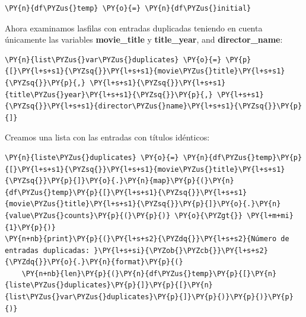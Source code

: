     \begin{tcolorbox}[breakable, size=fbox, boxrule=1pt, pad at break*=1mm,colback=cellbackground, colframe=cellborder]
\begin{Verbatim}[commandchars=\\\{\}]
\PY{n}{df\PYZus{}temp} \PY{o}{=} \PY{n}{df\PYZus{}initial}
\end{Verbatim}
\end{tcolorbox}

    Ahora examinamos lasfilas con entradas duplicadas teniendo en cuenta
únicamente las variables \textbf{movie\_title} y \textbf{title\_year},
and \textbf{director\_name}:

    \begin{tcolorbox}[breakable, size=fbox, boxrule=1pt, pad at break*=1mm,colback=cellbackground, colframe=cellborder]
\begin{Verbatim}[commandchars=\\\{\}]
\PY{n}{list\PYZus{}var\PYZus{}duplicates} \PY{o}{=} \PY{p}{[}\PY{l+s+s1}{\PYZsq{}}\PY{l+s+s1}{movie\PYZus{}title}\PY{l+s+s1}{\PYZsq{}}\PY{p}{,} \PY{l+s+s1}{\PYZsq{}}\PY{l+s+s1}{title\PYZus{}year}\PY{l+s+s1}{\PYZsq{}}\PY{p}{,} \PY{l+s+s1}{\PYZsq{}}\PY{l+s+s1}{director\PYZus{}name}\PY{l+s+s1}{\PYZsq{}}\PY{p}{]}
\end{Verbatim}
\end{tcolorbox}

    Creamos una lista con las entradas con títulos idénticos:

    \begin{tcolorbox}[breakable, size=fbox, boxrule=1pt, pad at break*=1mm,colback=cellbackground, colframe=cellborder]
\begin{Verbatim}[commandchars=\\\{\}]
\PY{n}{liste\PYZus{}duplicates} \PY{o}{=} \PY{n}{df\PYZus{}temp}\PY{p}{[}\PY{l+s+s1}{\PYZsq{}}\PY{l+s+s1}{movie\PYZus{}title}\PY{l+s+s1}{\PYZsq{}}\PY{p}{]}\PY{o}{.}\PY{n}{map}\PY{p}{(}\PY{n}{df\PYZus{}temp}\PY{p}{[}\PY{l+s+s1}{\PYZsq{}}\PY{l+s+s1}{movie\PYZus{}title}\PY{l+s+s1}{\PYZsq{}}\PY{p}{]}\PY{o}{.}\PY{n}{value\PYZus{}counts}\PY{p}{(}\PY{p}{)} \PY{o}{\PYZgt{}} \PY{l+m+mi}{1}\PY{p}{)}
\PY{n+nb}{print}\PY{p}{(}\PY{l+s+s2}{\PYZdq{}}\PY{l+s+s2}{Número de entradas duplicadas: }\PY{l+s+si}{\PYZob{}\PYZcb{}}\PY{l+s+s2}{\PYZdq{}}\PY{o}{.}\PY{n}{format}\PY{p}{(}
    \PY{n+nb}{len}\PY{p}{(}\PY{n}{df\PYZus{}temp}\PY{p}{[}\PY{n}{liste\PYZus{}duplicates}\PY{p}{]}\PY{p}{[}\PY{n}{list\PYZus{}var\PYZus{}duplicates}\PY{p}{]}\PY{p}{)}\PY{p}{)}\PY{p}{)}
\end{Verbatim}
\end{tcolorbox}

